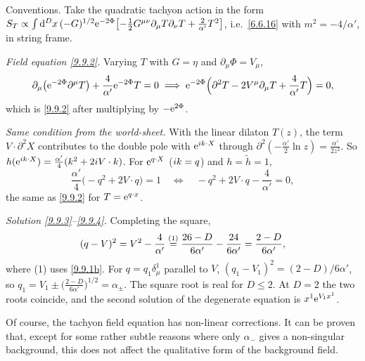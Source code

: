 \begin{tcolorbox}[breakable]
	\begin{remark}
		Conventions. Take the quadratic tachyon action in the form $S_T\propto\int\mathrm{d}^Dx\,(-G)^{1/2}\mathrm{e}^{-2\Phi}\bigl[-\frac12G^{\mu\nu}\partial_\mu T\partial_\nu T+\frac{2}{\alpha'}T^2\bigr]$, i.e.\ \eqref{6.6.16} with $m^2=-4/\alpha'$, in string frame.

		\emph{Field equation \eqref{9.9.2}.} Varying $T$ with $G=\eta$ and $\partial_\mu\Phi=V_\mu$,
		\begin{equation*}
			\partial_\mu\bigl(\mathrm{e}^{-2\Phi}\partial^\mu T\bigr)+\frac4{\alpha'}\mathrm{e}^{-2\Phi}T=0\;\Longrightarrow\;\mathrm{e}^{-2\Phi}\Bigl(\partial^2T-2V^\mu\partial_\mu T+\frac{4}{\alpha'}T\Bigr)=0 ,
		\end{equation*}
		which is \eqref{9.9.2} after multiplying by $-\mathrm{e}^{2\Phi}$.

		\emph{Same condition from the world-sheet.} With the linear dilaton $T(z)$, the term $V\cdot\partial^2X$ contributes to the double pole with $\mathrm{e}^{i k\cdot X}$ through $\partial^2(-\frac{\alpha'}{2}\ln z)=\frac{\alpha'}{2z^2}$. So $h(\mathrm{e}^{i k\cdot X})=\frac{\alpha'}{4}(k^2+2i V\cdot k)$. For $\mathrm{e}^{q\cdot X}$ ($i k=q$) and $h=\tilde h=1$,
		\begin{equation*}
			\frac{\alpha'}{4}\bigl(-q^2+2V\cdot q\bigr)=1\quad\Longleftrightarrow\quad-q^2+2V\cdot q-\frac{4}{\alpha'}=0,
		\end{equation*}
		the same as \eqref{9.9.2} for $T=\mathrm{e}^{q\cdot x}$.

		\emph{Solution \eqref{9.9.3}--\eqref{9.9.4}.} Completing the square,
		\begin{equation*}
			(q-V)^2=V^2-\frac{4}{\alpha'}\overset{(1)}{=}\frac{26-D}{6\alpha'}-\frac{24}{6\alpha'}=\frac{2-D}{6\alpha'} ,
		\end{equation*}
		where (1) uses \eqref{9.9.1b}. For $q=q_1\delta_\mu^1$ parallel to $V$, $(q_1-V_1)^2=(2-D)/6\alpha'$, so $q_1=V_1\pm\bigl(\frac{2-D}{6\alpha'}\bigr)^{1/2}=\alpha_\pm$. The square root is real for $D\le2$. At $D=2$ the two roots coincide, and the second solution of the degenerate equation is $x^1\mathrm{e}^{V_1x^1}$.
	\end{remark}
\end{tcolorbox}
Of course, the tachyon field equation has non-linear corrections. It can be proven that, except for some rather subtle reasons where only $\alpha_{-}$ gives a non-singular background, this does not affect the qualitative form of the background field.

